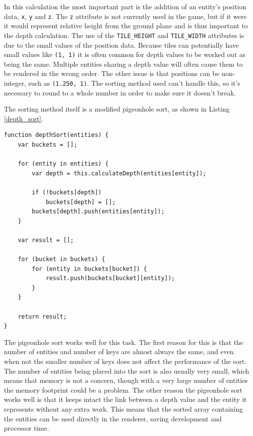 In this calculation the most important part is the addition of an entity's position data, \texttt{x}, \texttt{y} and \texttt{z}. The \texttt{z} attribute is not currently used in the game, but if it were it would represent relative height from the ground plane and is thus important to the depth calculation. The use of the \texttt{TILE\_HEIGHT} and \texttt{TILE\_WIDTH} attributes is due to the small values of the position data. Because tiles can potentially have small values like \texttt{(1, 1)} it is often common for depth values to be worked out as being the same. Multiple entities sharing a depth value will often cause them to be rendered in the wrong order. The other issue is that positions can be non-integer, such as \texttt{(1.250, 1)}. The sorting method used can't handle this, so it's necessary to round to a whole number in order to make sure it doesn't break.

The sorting method itself is a modified pigeonhole sort, as shown in Listing \ref{depth_sort}.

\noindent
\begin{minipage}{\linewidth}
\begin{lstlisting}[style=js, caption={Depth sorting entities in a scene using a modified pigeonhole sort.}, label=depth_sort]
function depthSort(entities) {
    var buckets = [];

    for (entity in entities) {
        var depth = this.calculateDepth(entities[entity]);

        if (!buckets[depth])
            buckets[depth] = [];
        buckets[depth].push(entities[entity]);
    }

    var result = [];

    for (bucket in buckets) {
        for (entity in buckets[bucket]) {
            result.push(buckets[bucket][entity]);
        }
    }

    return result;
}
\end{lstlisting}
\end{minipage}

The pigeonhole sort works well for this task. The first reason for this is that the number of entities and number of keys are almost always the same, and even when not the smaller number of keys does not affect the performance of the sort. The number of entities being placed into the sort is also usually very small, which means that memory is not a concern, though with a very large number of entities the memory footprint could be a problem. The other reason the pigeonhole sort works well is that it keeps intact the link between a depth value and the entity it represents without any extra work. This means that the sorted array containing the entities can be used directly in the renderer, saving development and processor time.

